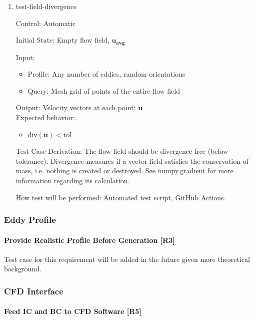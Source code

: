 \documentclass[12pt, titlepage]{article}
\begin{document}
\begin{enumerate}

  \item{test-field-divergence\\}

  Control: Automatic
            
  Initial State: Empty flow field, $\mathbf{u_{avg}}$
            
  Input:
  \begin{itemize}
    \item Profile: Any number of eddies, random orientations
    \item Query: Mesh grid of points of the entire flow field
  \end{itemize}
  Output: Velocity vectors at each point: $\mathbf{u}$\\
  Expected behavior:
  \begin{itemize}
    \item $\text{div}(\mathbf{u}) < \text{tol}$
  \end{itemize}

  Test Case Derivation: The flow field should be divergence-free (below tolerance). Divergence measures if a vector field satisfies the conservation of mass, i.e. nothing is created or destroyed. See \href{https://numpy.org/doc/stable/reference/generated/numpy.gradient.html}{numpy.gradient} for more information regarding its calculation.

  How test will be performed: Automated test script, GitHub Actions.

\end{enumerate}

\subsubsection{Eddy Profile} \label{EddyProfile}
\paragraph{Provide Realistic Profile Before Generation [R3]\\}
Test case for this requirement will be added in the future given more theoretical background.

\subsubsection{CFD Interface} \label{CFDInterface}
\paragraph{Feed IC and BC to CFD Software [R5]\\}
\end{document}
